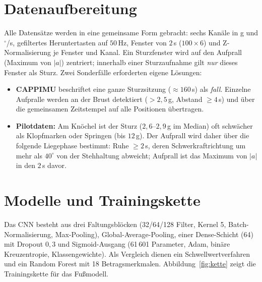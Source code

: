 \documentclass[11pt,a4paper,oneside,parskip=half,open=any,
               numbers=noenddot,listof=totoc,bibliography=totoc]{scrreprt}
\begin{document}
\section{Datenaufbereitung}
Alle Datensätze werden in eine gemeinsame Form gebracht: sechs Kanäle in
g und $^{\circ}$/s, gefiltertes Heruntertasten auf $50$\,Hz, Fenster von
$2$\,s ($100 \times 6$) und Z-Normalisierung je Fenster und Kanal. Ein
Sturzfenster wird auf den Aufprall (Maximum von $|a|$) zentriert;
innerhalb einer Sturzaufnahme gilt \emph{nur} dieses Fenster als Sturz.
Zwei Sonderfälle erforderten eigene Lösungen:

\begin{itemize}\setlength\itemsep{1pt}
\item \textbf{CAPPIMU} beschriftet eine ganze Sturzsitzung ($\approx 160$\,s)
      als \emph{fall}. Einzelne Aufpralle werden an der Brust detektiert
      ($>2{,}5$\,g, Abstand $\geq 4$\,s) und über die gemeinsamen
      Zeitstempel auf alle Positionen übertragen.
\item \textbf{Pilotdaten:} Am Knöchel ist der Sturz ($2{,}6$--$2{,}9$\,g
      im Median) oft schwächer als Klopfmarken oder Springen (bis
      $12$\,g). Der Aufprall wird daher über die folgende Liegephase
      bestimmt: Ruhe $\geq 2$\,s, deren Schwerkraftrichtung um mehr als
      $40^{\circ}$ von der Stehhaltung abweicht; Aufprall ist das Maximum
      von $|a|$ in den $2$\,s davor.
\end{itemize}

\section{Modelle und Trainingskette}
Das CNN besteht aus drei Faltungsblöcken (32/64/128 Filter, Kernel 5,
Batch-Normalisierung, Max-Pooling), Global-Average-Pooling, einer
Dense-Schicht (64) mit Dropout $0{,}3$ und Sigmoid-Ausgang (61\,601
Parameter, Adam, binäre Kreuzentropie, Klassengewichte). Als
Vergleich dienen ein Schwellwertverfahren und ein Random Forest mit 18
Betragsmerkmalen. Abbildung~\ref{fig:kette} zeigt die Trainingskette
für das Fußmodell.
\end{document}

